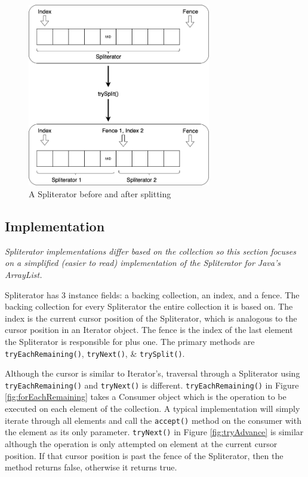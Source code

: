 \documentclass[oneside, a4paper, 11pt]{article}
\begin{document}
\begin{figure}[H]
\centering
\includegraphics[width=8cm]{images/spliterator_illustrated.png}
\caption{A Spliterator before and after splitting}
\label{fig:split}
\end{figure}

\subsection{Implementation}
\textit{Spliterator implementations differ based on the collection so this section focuses on a simplified (easier to read) implementation of the Spliterator for Java's ArrayList.}

Spliterator has 3 instance fields: a backing collection, an index, and a fence. The backing collection for every Spliterator the entire collection it is based on. The index is the current cursor position of the Spliterator, which is analogous to the cursor position in an Iterator object. The fence is the index of the last element the Spliterator is responsible for plus one. The primary methods are \verb|tryEachRemaining()|, \verb|tryNext()|, \& \verb|trySplit()|. 

Although the cursor is similar to Iterator's, traversal through a Spliterator using \verb|tryEachRemaining()| and \verb|tryNext()| is different. \verb|tryEachRemaining()| in Figure \ref{fig:forEachRemaining} takes a Consumer object which is the operation to be executed on each element of the collection. A typical implementation will simply iterate through all elements and call the \verb|accept()| method on the consumer with the element as its only parameter. \verb|tryNext()| in Figure \ref{fig:tryAdvance} is similar although the operation is only attempted on element at the current cursor position. If that cursor position is past the fence of the Spliterator, then the method returns false, otherwise it returns true.
\end{document}
